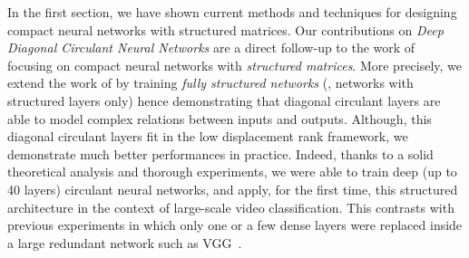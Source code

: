 In the first section, we have shown current methods and techniques for designing compact neural networks with structured matrices. 
Our contributions on \emph{Deep Diagonal Circulant Neural Networks} are a direct follow-up to the work of~\citet{cheng2015exploration,sindhwani2015structured,moczulski2016acdc,thomas2018learning} focusing on compact neural networks with \emph{structured matrices}.
More precisely, we extend the work of \citet{moczulski2016acdc} by training \emph{fully structured networks} (\ie, networks with structured layers only) hence demonstrating that diagonal circulant layers are able to model complex relations between inputs and outputs.
Although, this diagonal circulant layers fit in the low displacement rank framework, we demonstrate much better performances in practice.
Indeed, thanks to a solid theoretical analysis and thorough experiments, we were able to train deep (up to 40 layers) circulant neural networks, and apply, for the first time, this structured architecture in the context of large-scale video classification.
This contrasts with previous experiments in which only one or a few dense layers were replaced inside a large redundant network such as VGG~\cite{simonyan2014very}.






